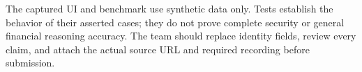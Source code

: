 \documentclass[conference,a4paper]{IEEEtran}
\begin{document}
The captured UI and benchmark use synthetic data only. Tests establish the behavior of their asserted cases; they do not prove complete security or general financial reasoning accuracy. The team should replace identity fields, review every claim, and attach the actual source URL and required recording before submission.

\FloatBarrier


\end{document}
